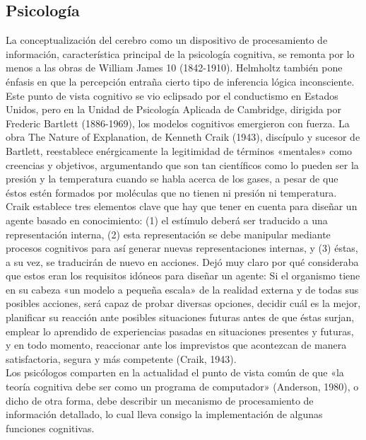 \documentclass[12pt,a4paper]{report}
\begin{document}
\subsection*{Psicología}
La conceptualización del cerebro como un dispositivo de procesamiento de información, característica principal de la psicología cognitiva, se remonta por lo menos a las obras de William James 10 (1842-1910). Helmholtz también pone énfasis en que la percepción entraña cierto tipo de inferencia lógica inconsciente. Este punto de vista cognitivo se vio eclipsado por el conductismo en Estados Unidos, pero en la Unidad de Psicología Aplicada de Cambridge, dirigida por Frederic Bartlett (1886-1969), los modelos cognitivos emergieron con fuerza. La obra The Nature of Explanation, de Kenneth Craik (1943), discípulo y sucesor de Bartlett, reestablece enérgicamente la legitimidad de términos «mentales» como creencias y objetivos, argumentando que son tan científicos como lo pueden ser la presión y la temperatura cuando se habla acerca de los gases, a pesar de que éstos estén formados por moléculas que no tienen ni presión ni temperatura. Craik establece tres elementos clave que hay que tener en cuenta para diseñar un agente basado en conocimiento: (1) el estímulo deberá ser traducido a una representación interna, (2) esta representación se debe manipular mediante procesos cognitivos para así generar nuevas representaciones internas, y (3) éstas, a su vez, se traducirán de nuevo en acciones. Dejó muy claro por qué consideraba que estos eran los requisitos idóneos para diseñar un agente: Si el organismo tiene en su cabeza «un modelo a pequeña escala» de la realidad externa y de todas sus posibles acciones, será capaz de probar diversas opciones, decidir cuál es la mejor, planificar su reacción ante posibles situaciones futuras antes de que éstas surjan, emplear lo aprendido de experiencias pasadas en situaciones presentes y futuras, y en todo momento, reaccionar ante los imprevistos que acontezcan de manera satisfactoria, segura y más competente (Craik, 1943).\\
Los psicólogos comparten en la actualidad el punto de vista común de que «la teoría cognitiva debe ser como un programa de computador» (Anderson, 1980), o dicho de otra forma, debe describir un mecanismo de procesamiento de información detallado, lo cual lleva consigo la implementación de algunas funciones cognitivas.
\end{document}
